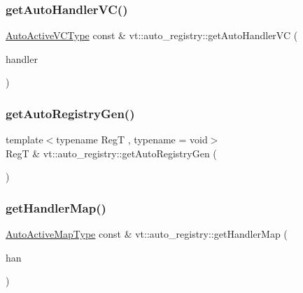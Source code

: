 \subsubsection{\texorpdfstring{get\+Auto\+Handler\+V\+C()}{getAutoHandlerVC()}}
{\footnotesize\ttfamily \hyperlink{namespacevt_1_1auto__registry_a3e4aadbe33ef7af6d8b87f72876aee41}{Auto\+Active\+V\+C\+Type} const  \& vt\+::auto\+\_\+registry\+::get\+Auto\+Handler\+VC (\begin{DoxyParamCaption}\item[{\hyperlink{namespacevt_af64846b57dfcaf104da3ef6967917573}{Handler\+Type} const}]{handler }\end{DoxyParamCaption})\hspace{0.3cm}{\ttfamily [inline]}}

\mbox{\label{namespacevt_1_1auto__registry_ab2ee3a933397aba4f50be12646be5fa7}} 
\subsubsection{\texorpdfstring{get\+Auto\+Registry\+Gen()}{getAutoRegistryGen()}}
{\footnotesize\ttfamily template$<$typename RegT , typename  = void$>$ \\
RegT \& vt\+::auto\+\_\+registry\+::get\+Auto\+Registry\+Gen (\begin{DoxyParamCaption}{ }\end{DoxyParamCaption})\hspace{0.3cm}{\ttfamily [inline]}}

\mbox{\label{namespacevt_1_1auto__registry_a5969065f9c4ca94b47b3d896859d2cf9}} 
\subsubsection{\texorpdfstring{get\+Handler\+Map()}{getHandlerMap()}}
{\footnotesize\ttfamily \hyperlink{namespacevt_1_1auto__registry_ae1bc8f9afc86cc589761fbbf22064601}{Auto\+Active\+Map\+Type} const  \& vt\+::auto\+\_\+registry\+::get\+Handler\+Map (\begin{DoxyParamCaption}\item[{\hyperlink{namespacevt_af64846b57dfcaf104da3ef6967917573}{Handler\+Type} const}]{han }\end{DoxyParamCaption})\hspace{0.3cm}{\ttfamily [inline]}}

